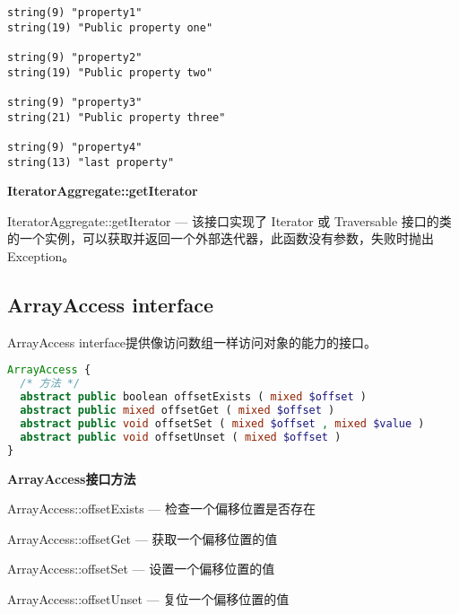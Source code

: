 \begin{verbatim}
string(9) "property1"
string(19) "Public property one"

string(9) "property2"
string(19) "Public property two"

string(9) "property3"
string(21) "Public property three"

string(9) "property4"
string(13) "last property"
\end{verbatim}


\textbf{IteratorAggregate::getIterator}

IteratorAggregate::getIterator — 该接口实现了 Iterator 或 Traversable 接口的类的一个实例，可以获取并返回一个外部迭代器，此函数没有参数，失败时抛出 Exception。


\subsection{ArrayAccess interface}


ArrayAccess interface提供像访问数组一样访问对象的能力的接口。



\begin{lstlisting}[language=PHP]
ArrayAccess {
  /* 方法 */
  abstract public boolean offsetExists ( mixed $offset )
  abstract public mixed offsetGet ( mixed $offset )
  abstract public void offsetSet ( mixed $offset , mixed $value )
  abstract public void offsetUnset ( mixed $offset )
}
\end{lstlisting}

\textbf{ArrayAccess接口方法}

\begin{compactitem}
\item ArrayAccess::offsetExists — 检查一个偏移位置是否存在
\item ArrayAccess::offsetGet — 获取一个偏移位置的值
\item ArrayAccess::offsetSet — 设置一个偏移位置的值
\item ArrayAccess::offsetUnset — 复位一个偏移位置的值
\end{compactitem}



